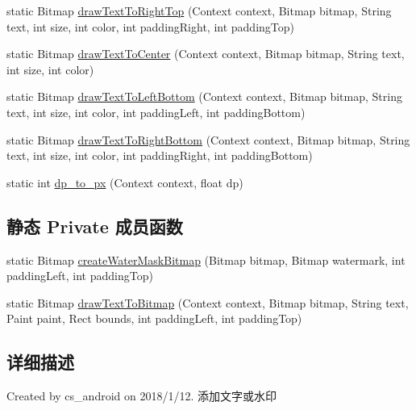 \begin{DoxyCompactItemize}
\item 
static Bitmap \mbox{\hyperlink{classcom_1_1example_1_1akisame__lin_1_1love__air2_1_1utils_1_1_image_utils_a177295d4a015a6229bc56c15164f3605}{draw\+Text\+To\+Right\+Top}} (Context context, Bitmap bitmap, String text, int size, int color, int padding\+Right, int padding\+Top)
\item 
static Bitmap \mbox{\hyperlink{classcom_1_1example_1_1akisame__lin_1_1love__air2_1_1utils_1_1_image_utils_a837c7cf263796be2862c651818cd20b4}{draw\+Text\+To\+Center}} (Context context, Bitmap bitmap, String text, int size, int color)
\item 
static Bitmap \mbox{\hyperlink{classcom_1_1example_1_1akisame__lin_1_1love__air2_1_1utils_1_1_image_utils_ac05a2bf61ba63bb6fabd42078a7da0f1}{draw\+Text\+To\+Left\+Bottom}} (Context context, Bitmap bitmap, String text, int size, int color, int padding\+Left, int padding\+Bottom)
\item 
static Bitmap \mbox{\hyperlink{classcom_1_1example_1_1akisame__lin_1_1love__air2_1_1utils_1_1_image_utils_ae0e17c2529891d31779fedbbcd71882d}{draw\+Text\+To\+Right\+Bottom}} (Context context, Bitmap bitmap, String text, int size, int color, int padding\+Right, int padding\+Bottom)
\item 
static int \mbox{\hyperlink{classcom_1_1example_1_1akisame__lin_1_1love__air2_1_1utils_1_1_image_utils_a142879b704b1e6e536794e4db141fe40}{dp\+\_\+to\+\_\+px}} (Context context, float dp)
\end{DoxyCompactItemize}
\subsection*{静态 Private 成员函数}
\begin{DoxyCompactItemize}
\item 
static Bitmap \mbox{\hyperlink{classcom_1_1example_1_1akisame__lin_1_1love__air2_1_1utils_1_1_image_utils_a533b22434c390f6c5e4da22a016bec87}{create\+Water\+Mask\+Bitmap}} (Bitmap bitmap, Bitmap watermark, int padding\+Left, int padding\+Top)
\item 
static Bitmap \mbox{\hyperlink{classcom_1_1example_1_1akisame__lin_1_1love__air2_1_1utils_1_1_image_utils_ae63dec81aa6843faaf416a6d0118a345}{draw\+Text\+To\+Bitmap}} (Context context, Bitmap bitmap, String text, Paint paint, Rect bounds, int padding\+Left, int padding\+Top)
\end{DoxyCompactItemize}


\subsection{详细描述}
Created by cs\+\_\+android on 2018/1/12. 添加文字或水印 

